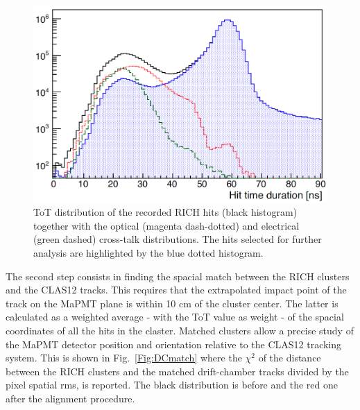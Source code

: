 \documentclass[5p,times,twocolumn]{elsarticle}
\def\MaPMT{MaPMT }
\begin{document}
\begin{figure}[t]
\begin{center}
\includegraphics[width=1.0\columnwidth]{xtalk.png}
\end{center}
\caption{ToT distribution of the recorded RICH hits (black histogram) together with the optical (magenta dash-dotted) and electrical (green dashed) cross-talk distributions.  The hits selected for further analysis are highlighted by the blue dotted histogram. }
\label{Fig:Xtalk}
\end{figure}


The second step consists in finding the spacial match between the RICH clusters and the CLAS12 tracks. This requires that the extrapolated impact point of the track on the \MaPMT plane is within 10 cm of the cluster center. The latter is calculated as a weighted average - with the ToT value as weight - of the spacial coordinates of all the hits in the claster. Matched clusters allow a precise study of the \MaPMT detector position and orientation relative to the CLAS12 tracking system. This is shown in  Fig.~\ref{Fig:DCmatch} where the $\chi^2$ of the distance between the RICH clusters and the matched drift-chamber tracks divided by the pixel spatial rms, is reported. The black distribution is before and the red one after the alignment procedure.
\end{document}
